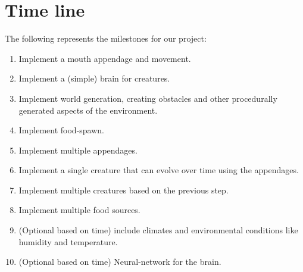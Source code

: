 \documentclass[runningheads]{llncs}
\begin{document}
\section{Time line}
The following represents the milestones for our project:
\begin{enumerate}
\item Implement a mouth appendage and movement.
\item Implement a (simple) brain for creatures.
\item Implement world generation, creating obstacles and other procedurally generated aspects of the environment.
\item Implement food-spawn.
\item Implement multiple appendages.
\item Implement a single creature that can evolve over time using the appendages.
\item Implement multiple creatures based on the previous step.
\item Implement multiple food sources.
\item (Optional based on time) include climates and environmental conditions like humidity and temperature.
\item (Optional based on time) Neural-network for the brain.
\end{enumerate}
%
%
%
%
%
%
\end{document}
